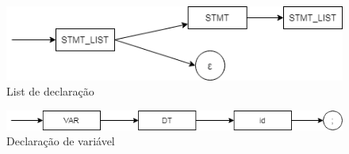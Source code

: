 \documentclass[]{article}
\numberwithin{equation}{section}
\begin{document}
\begin{center}
\begin{figure}[h!]
  \includegraphics[width=\linewidth]{./assets/stmt_list.png}
  \caption{List de declaração}
\end{figure}
\end{center}

\begin{center}
\begin{figure}[h!]
  \includegraphics[width=\linewidth]{./assets/var_decl.png}
  \caption{Declaração de variável}
\end{figure}
\end{center}
\end{document}
